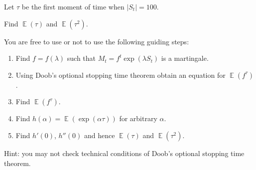 \documentclass[12pt]{article}
\DeclareMathOperator{\E}{\mathbb{E}}
\begin{document}
\begin{enumerate}
    Let $\tau$ be the first moment of time when $|S_t| = 100$.

    Find $\E(\tau)$ and $\E(\tau^2)$. 

    You are free to use or not to use the following guiding steps:

    \begin{enumerate}
        \item Find $f = f(\lambda)$ such that $M_t = f^t\exp(\lambda S_t)$ is a martingale.
        \item Using Doob's optional stopping time theorem obtain an equation for  $\E(f^\tau)$.
        \item Find $\E(f^\tau)$.
        \item Find $h(\alpha) = \E(\exp(\alpha \tau))$ for arbitrary $\alpha$.
        \item Find $h'(0)$, $h''(0)$ and hence $\E(\tau)$ and $\E(\tau^2)$.
    \end{enumerate}

    Hint: you may not check technical conditions of Doob's optional stopping time theorem.
    
\end{enumerate}
\end{document}
